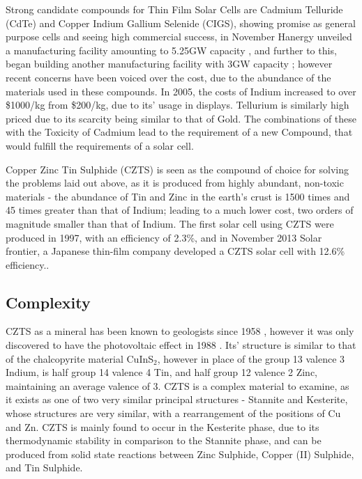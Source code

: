 Strong candidate compounds for Thin Film Solar Cells are Cadmium Telluride (CdTe) and Copper Indium Gallium Selenide (CIGS), showing promise as general purpose cells and seeing high commercial success, in November Hanergy unveiled a manufacturing facility amounting to 5.25GW capacity \citep{Mark}, and further to this, began building another manufacturing facility with 3GW capacity \citep{FinlayColville}; however recent concerns have been voiced over the cost, due to the abundance of the materials used in these compounds. In 2005, the costs of Indium increased to over \$1000/kg from \$200/kg, due to its' usage in displays. Tellurium is similarly high priced due to its scarcity being similar to that of Gold. The combinations of these with the Toxicity of Cadmium lead to the requirement of a new Compound, that would fulfill the requirements of a solar cell.

Copper Zinc Tin Sulphide (CZTS) is seen as the compound of choice for solving the problems laid out above, as it is produced from highly abundant, non-toxic materials - the abundance of Tin and Zinc in the earth's crust is 1500 times and 45 times greater than that of Indium; leading to a much lower cost, two orders of magnitude smaller than that of Indium.\citep{Wadia2009,Wang2011} 
The first solar cell using CZTS were produced in 1997, with an efficiency of 2.3\%, and in November 2013 Solar frontier, a Japanese thin-film company developed a CZTS solar cell with 12.6\% efficiency.\citep{Wang2013}.


\subsection{Complexity}

CZTS as a mineral has been known to geologists since 1958 \citep{Kissin1989}, however it was only discovered to have the photovoltaic effect in 1988 \citep{Ito1988}. Its' structure is similar to that of the chalcopyrite material CuInS$_2$, however in place of the group 13 valence 3 Indium, is half group 14 valence 4 Tin, and half group 12 valence 2 Zinc, maintaining an average valence of 3. CZTS is a complex material to examine, as it exists as one of two very similar principal structures - Stannite and Kesterite, whose structures are very similar, with a rearrangement of the positions of Cu and Zn.\citep{Schorr2007} CZTS is mainly found to occur in the Kesterite phase, due to its thermodynamic stability in comparison to the Stannite phase, and can be produced from solid state reactions between Zinc Sulphide, Copper (II) Sulphide, and Tin Sulphide.


